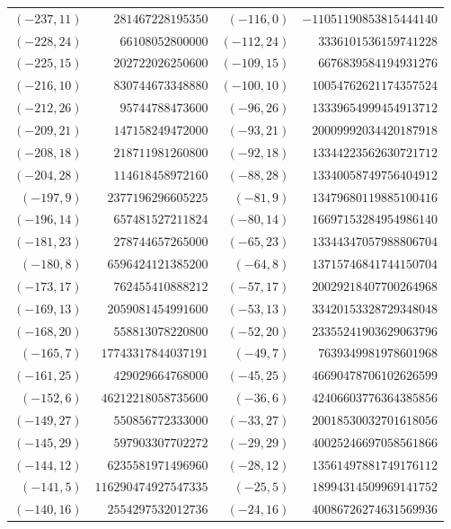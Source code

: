 \documentclass[11pt]{amsart}
\theoremstyle{definition}
\begin{document}
{\scriptsize\begin{tabular}{@{}r@{\ \ }r@{\qquad}r@{\ \ }r@{}}
$(-237,11)$ & $281467228195350$ & $(-116,0)$ & $-11051190853815444140$ \\
$(-228,24)$ & $66108052800000$ & $(-112,24)$ & $3336101536159741228$ \\
$(-225,15)$ & $202722026250600$ & $(-109,15)$ & $6676839584194931276$ \\
$(-216,10)$ & $830744673348880$ & $(-100,10)$ & $10054762621174357524$ \\
$(-212,26)$ & $95744788473600$ & $(-96,26)$ & $13339654999454913712$ \\
$(-209,21)$ & $147158249472000$ & $(-93,21)$ & $20009992034420187918$ \\
$(-208,18)$ & $218711981260800$ & $(-92,18)$ & $13344223562630721712$ \\
$(-204,28)$ & $114618458972160$ & $(-88,28)$ & $13340058749756404912$ \\
$(-197,9)$ & $2377196296605225$ & $(-81,9)$ & $13479680119885100416$ \\
$(-196,14)$ & $657481527211824$ & $(-80,14)$ & $16697153284954986140$ \\
$(-181,23)$ & $278744657265000$ & $(-65,23)$ & $13344347057988806704$ \\
$(-180,8)$ & $6596424121385200$ & $(-64,8)$ & $13715746841744150704$ \\
$(-173,17)$ & $762455410888212$ & $(-57,17)$ & $20029218407700264968$ \\
$(-169,13)$ & $2059081454991600$ & $(-53,13)$ & $33420153328729348048$ \\
$(-168,20)$ & $558813078220800$ & $(-52,20)$ & $23355241903629063796$ \\
$(-165,7)$ & $17743317844037191$ & $(-49,7)$ & $7639349981978601968$ \\
$(-161,25)$ & $429029664768000$ & $(-45,25)$ & $46690478706102626599$ \\
$(-152,6)$ & $46212218058735600$ & $(-36,6)$ & $42406603776364385856$ \\
$(-149,27)$ & $550856772333000$ & $(-33,27)$ & $20018530032701618056$ \\
$(-145,29)$ & $597903307702272$ & $(-29,29)$ & $40025246697058561866$ \\
$(-144,12)$ & $6235581971496960$ & $(-28,12)$ & $13561497881749176112$ \\
$(-141,5)$ & $116290474927547335$ & $(-25,5)$ & $18994314509969141752$ \\
$(-140,16)$ & $2554297532012736$ & $(-24,16)$ & $40086726274631569936$ \\

\end{tabular}}
\end{document}
